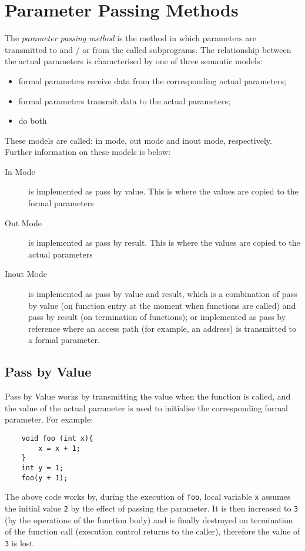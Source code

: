 \section{Parameter Passing Methods}
The \textit{parameter passing method} is the method in which parameters are transmitted to and / or from the called subprograms. The relationship between the actual parameters is characterised by one of three semantic models:
\begin{itemize}
    \item formal parameters receive data from the corresponding actual parameters;
    \item formal parameters transmit data to the actual parameters; 
    \item do both
\end{itemize}

These models are called: in mode, out mode and inout mode, respectively. Further information on these models is below:
\begin{description}
    \item[In Mode] is implemented as pass by value. This is where the values are copied to the formal parameters
    \item[Out Mode] is implemented as pass by result. This is where the values are copied to the actual parameters
    \item[Inout Mode] is implemented as pass by value and result, which is a combination of pass by value (on function entry at the moment when functions are called) and pass by result (on termination of functions); or implemented as pass by reference where an access path (for example, an address) is transmitted to a formal parameter. 
\end{description}

\subsection{Pass by Value}
Pass by Value works by transmitting the value when the function is called, and the value of the actual parameter is used to initialise the corresponding formal parameter. For example:
\begin{verbatim}
    void foo (int x){
        x = x + 1;
    }
    int y = 1;
    foo(y + 1);
\end{verbatim}
The above code works by, during the execution of \verb|foo|, local variable \verb|x| assumes the initial value \verb|2| by the effect of passing the parameter. It is then increased to \verb|3| (by the operations of the function body) and is finally destroyed on termination of the function call (execution control returns to the caller), therefore the value of \verb|3| is lost. \\

